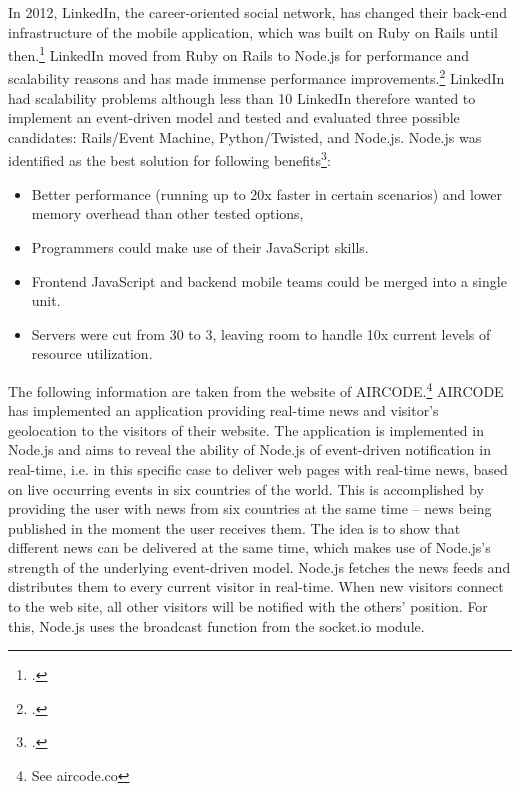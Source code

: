 \begin{appendices}
\begin{subappendices}
\newpage
{}
\label{app:case_linkedin}
In 2012, LinkedIn, the career-oriented social network, has changed their back-end infrastructure of the mobile application, which was built on Ruby on Rails until then.\footcite[Cf.][]{Avram_2012} LinkedIn moved from Ruby on Rails to Node.js for performance and scalability reasons and has made immense performance improvements.\footcite[Cf.][]{ODell_2011} 
LinkedIn had scalability problems although less than 10%
LinkedIn therefore wanted to implement an event-driven model and tested and evaluated three possible candidates: Rails/Event Machine, Python/Twisted, and Node.js.
Node.js was identified as the best solution for following benefits\footcite[Cf.][]{Avram_2012}:
\begin{itemize}
  \item Better performance (running up to 20x faster in certain scenarios) and lower memory overhead than other tested options, 
  \item Programmers could make use of their JavaScript skills. 
  \item Frontend JavaScript and backend mobile teams could be merged into a single unit. 
  \item Servers were cut from 30 to 3, leaving room to handle 10x current levels of resource utilization.
\end{itemize}
\newpage
{}
\label{app:case_aircode}

The following information are taken from the website of AIRCODE.\footnote{See aircode.co}
AIRCODE has implemented an application providing real-time news and visitor’s geolocation to the visitors of their website. The application is implemented in Node.js and aims to reveal the ability of Node.js of event-driven notification in real-time, i.e. in this specific case to deliver web pages with real-time news, based on live occurring events in six countries of the world. This is accomplished by providing the user with news from six countries at the same time – news being published in the moment the user receives them. The idea is to show that different news can be delivered at the same time, which makes use of Node.js’s strength of the underlying event-driven model.
Node.js fetches the news feeds and distributes them to every current visitor in real-time. When new visitors connect to the web site, all other visitors will be notified with the others’ position. For this, Node.js uses the broadcast function from the socket.io module.


\end{subappendices}
\end{appendices}

